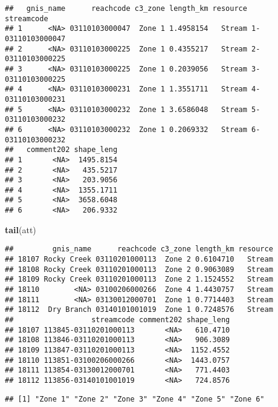 \documentclass[
]{article}
\newenvironment{Shaded}{\begin{snugshade}}{\end{snugshade}}
\newcommand{\KeywordTok}[1]{\textcolor[rgb]{0.13,0.29,0.53}{\textbf{#1}}}
\newcommand{\NormalTok}[1]{#1}
\newcommand{\OperatorTok}[1]{\textcolor[rgb]{0.81,0.36,0.00}{\textbf{#1}}}
\begin{document}
\begin{verbatim}
##   gnis_name      reachcode c3_zone length_km resource       streamcode
## 1      <NA> 03110103000047  Zone 1 1.4958154   Stream 1-03110103000047
## 2      <NA> 03110103000225  Zone 1 0.4355217   Stream 2-03110103000225
## 3      <NA> 03110103000225  Zone 1 0.2039056   Stream 3-03110103000225
## 4      <NA> 03110103000231  Zone 1 1.3551711   Stream 4-03110103000231
## 5      <NA> 03110103000232  Zone 1 3.6586048   Stream 5-03110103000232
## 6      <NA> 03110103000232  Zone 1 0.2069332   Stream 6-03110103000232
##   comment202 shape_leng
## 1       <NA>  1495.8154
## 2       <NA>   435.5217
## 3       <NA>   203.9056
## 4       <NA>  1355.1711
## 5       <NA>  3658.6048
## 6       <NA>   206.9332
\end{verbatim}

\begin{Shaded}
\begin{Highlighting}[]
\KeywordTok{tail}\NormalTok{(att)}
\end{Highlighting}
\end{Shaded}

\begin{verbatim}
##         gnis_name      reachcode c3_zone length_km resource
## 18107 Rocky Creek 03110201000113  Zone 2 0.6104710   Stream
## 18108 Rocky Creek 03110201000113  Zone 2 0.9063089   Stream
## 18109 Rocky Creek 03110201000113  Zone 2 1.1524552   Stream
## 18110        <NA> 03100206000266  Zone 4 1.4430757   Stream
## 18111        <NA> 03130012000701  Zone 1 0.7714403   Stream
## 18112  Dry Branch 03140101001019  Zone 1 0.7248576   Stream
##                  streamcode comment202 shape_leng
## 18107 113845-03110201000113       <NA>   610.4710
## 18108 113846-03110201000113       <NA>   906.3089
## 18109 113847-03110201000113       <NA>  1152.4552
## 18110 113851-03100206000266       <NA>  1443.0757
## 18111 113854-03130012000701       <NA>   771.4403
## 18112 113856-03140101001019       <NA>   724.8576
\end{verbatim}

\begin{Shaded}
\end{Shaded}

\begin{verbatim}
## [1] "Zone 1" "Zone 2" "Zone 3" "Zone 4" "Zone 5" "Zone 6"
\end{verbatim}
\end{document}
